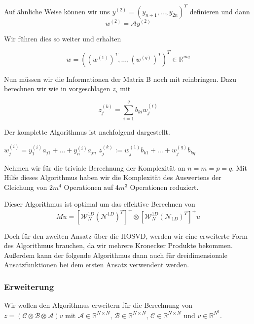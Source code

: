 Auf ähnliche Weise können wir uns $y^{(2)}=(y_{n+1},\dots,y_{2n})^{T}$ definieren und dann
\begin{equation*}
w^{(2)} = \mathcal{A}y^{(2)}
\end{equation*}

Wir führen dies so weiter und erhalten

\begin{equation*}
w=( (w^{(1)})^T , \dots, (w^{(q)})^T)^T \in \mathbb{R}^{mq}
\end{equation*}

Nun müssen wir die Informationen der Matrix B noch mit reinbringen. Dazu berechnen wir wie in \cite{Teachlet} vorgeschlagen $z_i$ mit

\begin{equation*}
z^{(k)}_j = \sum_{i=1}^{q} b_{ki} w_j^{(i)}
\end{equation*}

Der komplette Algorithmus ist nachfolgend dargestellt.
\begin{mdframed}[backgroundcolor=blue!3] 
\begin{algorithmic}
			\State $w^{(i)}_{j} = y^{(i)}_1 a_{j1} + \dots + y^{(i)}_n a_{jn}$
	\EndFor
\EndFor
{}
			\State $z^{(k)}_j := w^{(1)}_j b_{k1} + \dots + w^{(q)}_j b_{kq}$
	\EndFor
\EndFor

\end{algorithmic}
\end{mdframed}


Nehmen wir für die triviale Berechnung der Komplexität an $n=m=p=q$.
Mit Hilfe dieses Algorithmus haben wir die Komplexität des Auswertens der Gleichung von $2m^4$ Operationen auf $4m^3$ Operationen reduziert.

Dieser Algorithmus ist optimal um das effektive Berechnen von
\begin{equation*}
Mu=[\mathcal{W}_N^{1D} (\mathcal{N}^{1D})^T]^+ \otimes [\mathcal{W}_N^{1D} (\mathcal{N}_{1D})^T]^+ u
\end{equation*}

Doch für den zweiten Ansatz über die HOSVD,  werden wir eine erweiterte Form des Algorithmus brauchen, da wir mehrere Kronecker Produkte bekommen. Außerdem kann der folgende Algorithmus dann auch für dreidimensionale Ansatzfunktionen bei dem ersten Ansatz verwendent werden.


\subsubsection{Erweiterung}
Wir wollen den Algorithmus erweitern für die Berechnung von $z=(\mathcal{C} \otimes \mathcal{B} \otimes \mathcal{A})v$ mit $\mathcal{A} \in \mathbb{R}^{N \times N}$, $\mathcal{B} \in \mathbb{R}^{N \times N}$, $\mathcal{C} \in \mathbb{R}^{N \times N}$ und $v \in \mathbb{R}^{N^3}$.


